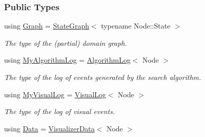 \subsubsection*{Public Types}
\begin{DoxyCompactItemize}
\item 
using \hyperlink{structslb_1_1core_1_1ui_1_1Visualizer_ac8db3a9d8995c036199d314358df4d33}{Graph} = \hyperlink{structslb_1_1core_1_1ui_1_1StateGraph}{State\+Graph}$<$ typename Node\+::\+State $>$\hypertarget{structslb_1_1core_1_1ui_1_1Visualizer_ac8db3a9d8995c036199d314358df4d33}{}\label{structslb_1_1core_1_1ui_1_1Visualizer_ac8db3a9d8995c036199d314358df4d33}

\begin{DoxyCompactList}\small\item\em The type of the (partial) domain graph. \end{DoxyCompactList}\item 
using \hyperlink{structslb_1_1core_1_1ui_1_1Visualizer_aa8d54754716436cc1a07935d514f4b53}{My\+Algorithm\+Log} = \hyperlink{structslb_1_1core_1_1ui_1_1AlgorithmLog}{Algorithm\+Log}$<$ Node $>$\hypertarget{structslb_1_1core_1_1ui_1_1Visualizer_aa8d54754716436cc1a07935d514f4b53}{}\label{structslb_1_1core_1_1ui_1_1Visualizer_aa8d54754716436cc1a07935d514f4b53}

\begin{DoxyCompactList}\small\item\em The type of the log of events generated by the search algorithm. \end{DoxyCompactList}\item 
using \hyperlink{structslb_1_1core_1_1ui_1_1Visualizer_ad26933ab8983c1b2102b0c5b3331ecc4}{My\+Visual\+Log} = \hyperlink{structslb_1_1core_1_1ui_1_1VisualLog}{Visual\+Log}$<$ Node $>$\hypertarget{structslb_1_1core_1_1ui_1_1Visualizer_ad26933ab8983c1b2102b0c5b3331ecc4}{}\label{structslb_1_1core_1_1ui_1_1Visualizer_ad26933ab8983c1b2102b0c5b3331ecc4}

\begin{DoxyCompactList}\small\item\em The type of the log of visual events. \end{DoxyCompactList}\item 
using \hyperlink{structslb_1_1core_1_1ui_1_1Visualizer_a8995f54a15fd9a07e0a7d23af0273aa6}{Data} = \hyperlink{structslb_1_1core_1_1ui_1_1VisualizerData}{Visualizer\+Data}$<$ Node $>$\hypertarget{structslb_1_1core_1_1ui_1_1Visualizer_a8995f54a15fd9a07e0a7d23af0273aa6}{}\label{structslb_1_1core_1_1ui_1_1Visualizer_a8995f54a15fd9a07e0a7d23af0273aa6}


\end{DoxyCompactItemize}
